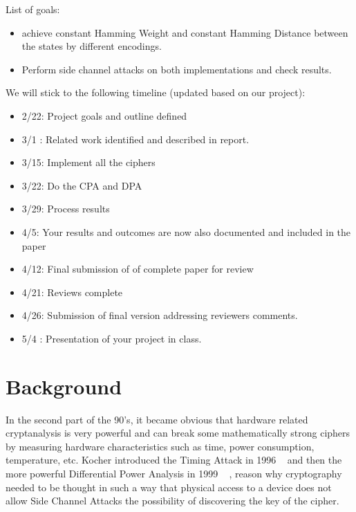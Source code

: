 \documentclass[conference]{IEEEtran}
\begin{document}
List of goals:
\begin{itemize}
        \item achieve constant Hamming Weight and constant Hamming Distance between the states by different encodings.
        \item Perform side channel attacks on both implementations and check results.
\end{itemize}


We will stick to the following timeline (updated based on our project):

\begin{itemize}
	\item 2/22: Project goals and outline defined
	\item 3/1 : Related work identified and described in report.
	\item 3/15: Implement all the ciphers
	\item 3/22: Do the CPA and DPA
	\item 3/29: Process results
	\item 4/5:  Your results and outcomes are now also documented and included in the paper
	\item 4/12: Final submission of of complete paper for review
	\item 4/21: Reviews complete
	\item 4/26: Submission of final version addressing reviewers comments.
	\item 5/4 : Presentation of your project in class.
\end{itemize}

\section{Background}\label{sec:background}

In the second part of the 90's, it became obvious that hardware related cryptanalysis is very powerful and can break some mathematically strong ciphers by measuring hardware characteristics such as time, power consumption, temperature, etc. Kocher introduced the Timing Attack in 1996 ~\cite{KocherTiming} and then the more powerful Differential Power Analysis in 1999 ~\cite{KocherDPA} , reason why cryptography needed to be thought in such a way that physical access to a device does not allow Side Channel Attacks the possibility of discovering the key of the cipher.
\end{document}
